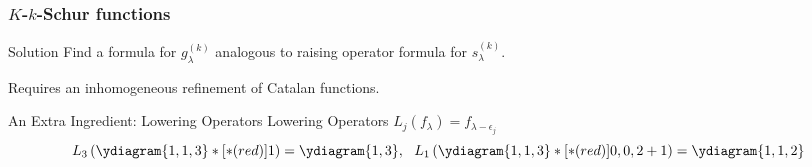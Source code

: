 \documentclass{beamer}
\newcommand{\mynone}{\ }
\begin{document}
\begin{frame}
  \frametitle{\(K\)-\(k\)-Schur functions}
  \begin{block}{Solution}
    Find a formula for \(g^{(k)}_\lambda\) analogous to raising
    operator formula for \(s^{(k)}_\lambda\). \pause
  \end{block}
  Requires an inhomogeneous refinement of Catalan functions.
\end{frame}
\begin{frame}{An Extra Ingredient: Lowering Operators}
   Lowering Operators 
     \(L_j(f_\lambda) = f_{\lambda-\epsilon_j}\)
            \[ L_3\left( \ydiagram{1,1,3}*[*(red)]{1} \right) =
              \ydiagram{1,3}, \ \ L_{1}\left( \ydiagram{1,1,3}*[*(red)]{0,0,2+1} \right)
              = \ydiagram{1,1,2}
              \]
\end{frame}
\end{document}
